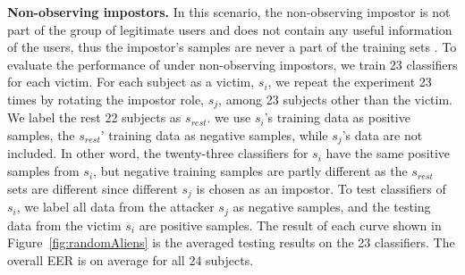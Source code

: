 \noindent \textbf{Non-observing impostors.} 
In this scenario, the non-observing impostor  is not part of the group of legitimate users and does not contain any useful information of the users, thus the impostor's samples are never a part of the training sets . To evaluate the performance of \CiT under non-observing impostors, we train 23 classifiers for each victim. For each subject as a victim, $s_i$, we repeat the experiment 23 times by rotating the impostor role, $s_j$, among 23 subjects other than the victim. 
We label the rest 22 subjects as $s_{rest}$. 
we use $s_i$'s training data as positive samples, the $s_{rest}$' training data as negative samples, while $s_j$'s data are not included. 
In other word, the twenty-three classifiers for $s_i$ have the same positive samples from $s_i$, but negative training samples are partly different as the $s_{rest}$ sets are different since different $s_j$ is chosen as an impostor. 
To test classifiers of $s_i$, we label all data from the attacker $s_j$ as negative samples, and the testing data from the victim $s_i$ are positive samples. The result of each curve shown in Figure~\ref{fig:randomAliens} is the averaged testing results on the 23 classifiers. The overall EER is  on average for all 24 subjects.








